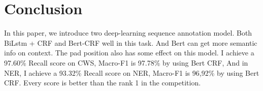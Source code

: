\section{Conclusion}
\label{sec:Conclusion}
In this paper, we introduce two deep-learning sequence annotation model. Both BiLstm + CRF and Bert-CRF well in this task. And Bert can get more semantic info on context.
The pad position also has some effect on this model.
I achieve a 97.60\% Recall score on CWS,  Macro-F1 is 97.78\% by using Bert CRF, And in NER,  I achieve a 93.32\% Recall score on NER,  Macro-F1 is 96,92\% by using Bert CRF.
Every score is better than the rank 1 in the competition. 